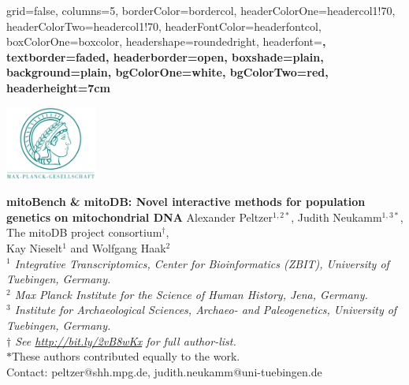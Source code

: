 \documentclass[a0paper,portrait]{baposter}
\begin{document}

\begin{poster}{
	grid=false,
	columns=5,
	borderColor=bordercol,
	headerColorOne=headercol1!70,%
	headerColorTwo=headercol1!70,%
	headerFontColor=headerfontcol,
	boxColorOne=boxcolor,
	headershape=roundedright,
	headerfont=\large\sf\bf,
	textborder=faded,%
	headerborder=open,
  	boxshade=plain,
	background=plain,
	bgColorOne=white,
	bgColorTwo=red,
	headerheight=7cm
}
{

	\includegraphics[width=3cm]{figures/Max-Planck-Gesellschaft.png}

}
{\Huge\bf
	mitoBench \& mitoDB: Novel interactive methods for population genetics on mitochondrial DNA
}
{
	\vspace{1em} Alexander Peltzer$^{1,2*}$, Judith Neukamm$^{1,3*}$, The mitoDB project consortium$^\dagger$,\\ Kay Nieselt$^{1}$ and Wolfgang Haak$^{2}$\\
	{\footnotesize \textit{$^1$ Integrative Transcriptomics, Center for Bioinformatics (ZBIT), University of Tuebingen, Germany.\\
	$^2$ Max Planck Institute for the Science of Human History, Jena, Germany.\\
	$^3$ Institute for Archaeological Sciences, Archaeo- and Paleogenetics, University of Tuebingen, Germany.\\
	$\dagger$ See \url{http://bit.ly/2vB8wKx} for full author-list.}\\
	$*$These authors contributed equally to the work. \\
	\vspace{1em}
	Contact: peltzer@shh.mpg.de, judith.neukamm@uni-tuebingen.de
	}
}
{

}
\end{poster}
\end{document}
